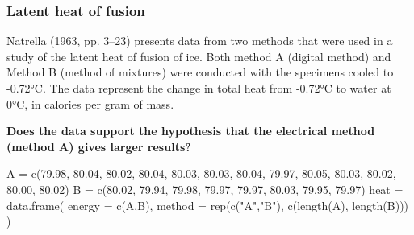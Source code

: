 \documentclass[a4paper]{article}
\begin{document}
\subsubsection{Latent heat of fusion}
Natrella (1963, pp. 3--23) presents data from two methods that were used in a study of the latent heat of fusion of ice. Both method A (digital method) and Method B (method of mixtures) were conducted with the specimens cooled to -0.72°C. The data represent the change in total heat from -0.72°C to water at 0°C, in calories per gram of mass.
\begin{greenbox}
	\textbf{Does the data support the hypothesis that the electrical method (method A) gives larger results?}
\end{greenbox}
\begin{Schunk}
\begin{Sinput}
A = c(79.98, 80.04, 80.02, 80.04, 80.03, 80.03, 80.04, 
      79.97, 80.05, 80.03, 80.02, 80.00, 80.02)
B = c(80.02, 79.94, 79.98, 79.97, 79.97, 80.03, 79.95, 
      79.97)
heat = data.frame(
  energy = c(A,B),
  method = rep(c("A","B"), c(length(A), length(B)))
)
\end{Sinput}
\end{Schunk}
\end{document}
